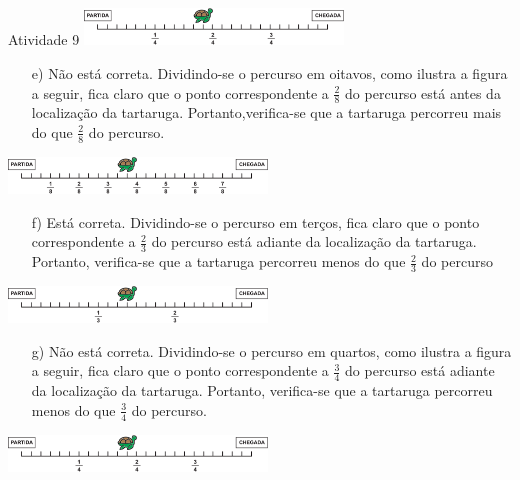 \begin{multicols}{2}
\begin{resposta*}{Atividade 9}
 \includegraphics[width=195pt, keepaspectratio]{..//media/cap3/secoes/png/ativ9_resp_d}

\begin{enumerate} [\quad a)] %
  \item[e)]     Não está correta. Dividindo-se o percurso em oitavos, como ilustra a figura a seguir, fica claro que o ponto correspondente a     $\frac{2}{8}$     do percurso está antes da localização da tartaruga. Portanto,verifica-se que a tartaruga percorreu mais do que     $\frac{2}{8}$     do percurso.          
\end{enumerate}

 \includegraphics[width=195pt, keepaspectratio]{..//media/cap3/secoes/png/ativ9_resp_e}

\begin{enumerate} [\quad a)] %

  \item[f)]     Está correta. Dividindo-se o percurso em terços, fica claro que o ponto correspondente a     $\frac{2}{3}$     do percurso está adiante da localização da tartaruga. Portanto, verifica-se que a tartaruga percorreu menos do que     $\frac{2}{3}$     do percurso          
\end{enumerate}

 \includegraphics[width=195pt, keepaspectratio]{..//media/cap3/secoes/png/ativ9_resp_f}

\begin{enumerate} [\quad a)] %

  \item[g)]     Não está correta. Dividindo-se o percurso em quartos, como ilustra a figura a seguir, fica claro que o ponto correspondente a     $\frac{3}{4}$     do percurso está adiante da localização da tartaruga. Portanto, verifica-se que a tartaruga percorreu menos do que     $\frac{3}{4}$     do percurso.          
\end{enumerate}

 \includegraphics[width=195pt, keepaspectratio]{..//media/cap3/secoes/png/ativ9_resp_g}


\end{resposta*}
\end{multicols}

